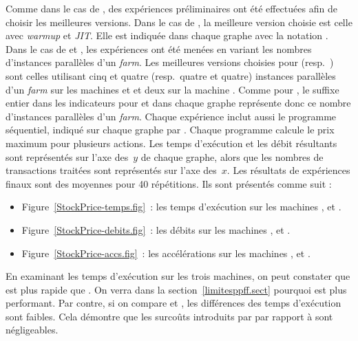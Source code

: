 Comme dans le cas de , des exp\'eriences pr\'eliminaires ont \'et\'e effectu\'ees afin de choisir les meilleures versions. Dans le cas de , la meilleure version choisie est celle avec \emph{warmup} et \emph{JIT}. Elle est indiqu\'ee dans chaque graphe avec la notation . Dans le cas de  et , les exp\'eriences ont \'et\'e men\'ees en variant les nombres d'instances parall\`eles d'un \emph{farm}. Les meilleures versions choisies pour  (resp.\ ) sont celles utilisant cinq et quatre (resp.\ quatre et quatre) instances parall\`eles d'un \emph{farm} sur les machines  et  et deux sur la machine . Comme pour , le suffixe entier dans les indicateurs pour  et  dans chaque graphe repr\'esente donc ce nombre d'instances parall\`eles d'un \emph{farm}. Chaque exp\'erience inclut aussi le programme s\'equentiel, indiqu\'e sur chaque graphe par . Chaque programme calcule le prix maximum pour plusieurs actions. Les temps d'ex\'ecution et les d\'ebit r\'esultants sont repr\'esent\'es sur l'axe des~$y$ de chaque graphe, alors que les nombres de transactions trait\'ees sont repr\'esent\'es sur l'axe des~$x$. Les r\'esultats de exp\'eriences finaux sont des moyennes pour 40 r\'ep\'etitions. Ils sont pr\'esent\'es comme suit :


\begin{itemize}

\item Figure~\ref{StockPrice-temps.fig}~: les temps d'ex\'ecution sur les machines ,  et .

\item Figure~\ref{StockPrice-debits.fig}~: les d\'ebits sur les machines ,  et .

\item Figure~\ref{StockPrice-accs.fig}~: les accélérations sur les machines ,  et .

\end{itemize}


En examinant les temps d'ex\'ecution sur les trois machines, on peut constater que  est plus rapide que . On verra dans la section~\ref{limitesppff.sect} pourquoi  est plus performant. Par contre, si on compare  et , les diff\'erences des temps d'ex\'ecution sont faibles. Cela d\'emontre que les surco\^uts introduits par  par rapport \`a  sont négligeables.


